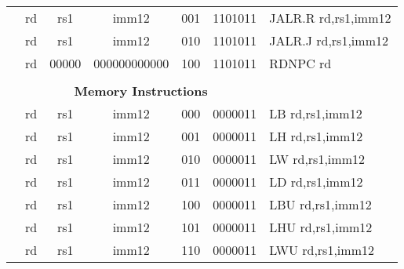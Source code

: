 \begin{table}[p]
\begin{small}
\begin{center}
\begin{tabular}{rccccccccccl}
&
\multicolumn{1}{|c|}{rd} &
\multicolumn{1}{c|}{rs1} &
\multicolumn{5}{c|}{imm12} &
\multicolumn{2}{c|}{001} &
\multicolumn{1}{c|}{1101011} & JALR.R rd,rs1,imm12 \\
\cline{2-11}
  

&
\multicolumn{1}{|c|}{rd} &
\multicolumn{1}{c|}{rs1} &
\multicolumn{5}{c|}{imm12} &
\multicolumn{2}{c|}{010} &
\multicolumn{1}{c|}{1101011} & JALR.J rd,rs1,imm12 \\
\cline{2-11}
  

&
\multicolumn{1}{|c|}{rd} &
\multicolumn{1}{c|}{00000} &
\multicolumn{5}{c|}{000000000000} &
\multicolumn{2}{c|}{100} &
\multicolumn{1}{c|}{1101011} & RDNPC rd \\
\cline{2-11}
  

&
\multicolumn{10}{c}{} & \\
&
\multicolumn{10}{c}{\bf Memory Instructions} & \\
\cline{2-11}
  

&
\multicolumn{1}{|c|}{rd} &
\multicolumn{1}{c|}{rs1} &
\multicolumn{5}{c|}{imm12} &
\multicolumn{2}{c|}{000} &
\multicolumn{1}{c|}{0000011} & LB rd,rs1,imm12 \\
\cline{2-11}
  

&
\multicolumn{1}{|c|}{rd} &
\multicolumn{1}{c|}{rs1} &
\multicolumn{5}{c|}{imm12} &
\multicolumn{2}{c|}{001} &
\multicolumn{1}{c|}{0000011} & LH rd,rs1,imm12 \\
\cline{2-11}
  

&
\multicolumn{1}{|c|}{rd} &
\multicolumn{1}{c|}{rs1} &
\multicolumn{5}{c|}{imm12} &
\multicolumn{2}{c|}{010} &
\multicolumn{1}{c|}{0000011} & LW rd,rs1,imm12 \\
\cline{2-11}
  

&
\multicolumn{1}{|c|}{rd} &
\multicolumn{1}{c|}{rs1} &
\multicolumn{5}{c|}{imm12} &
\multicolumn{2}{c|}{011} &
\multicolumn{1}{c|}{0000011} & LD rd,rs1,imm12 \\
\cline{2-11}
  

&
\multicolumn{1}{|c|}{rd} &
\multicolumn{1}{c|}{rs1} &
\multicolumn{5}{c|}{imm12} &
\multicolumn{2}{c|}{100} &
\multicolumn{1}{c|}{0000011} & LBU rd,rs1,imm12 \\
\cline{2-11}
  

&
\multicolumn{1}{|c|}{rd} &
\multicolumn{1}{c|}{rs1} &
\multicolumn{5}{c|}{imm12} &
\multicolumn{2}{c|}{101} &
\multicolumn{1}{c|}{0000011} & LHU rd,rs1,imm12 \\
\cline{2-11}
  

&
\multicolumn{1}{|c|}{rd} &
\multicolumn{1}{c|}{rs1} &
\multicolumn{5}{c|}{imm12} &
\multicolumn{2}{c|}{110} &
\multicolumn{1}{c|}{0000011} & LWU rd,rs1,imm12 \\
\cline{2-11}
  


\end{tabular}
\end{center}
\end{small}
\end{table}
